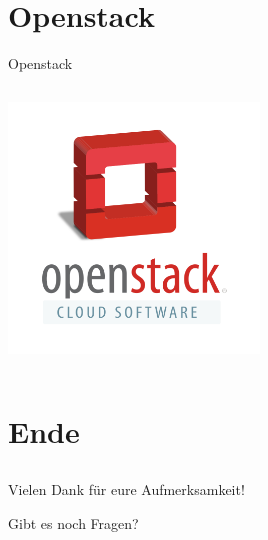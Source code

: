 \documentclass[aspectratio=169]{beamer}
\begin{document}
 
\section{Openstack} 
\begin{frame}{Openstack}
    \begin{columns}
        \begin{column}{1.0\textwidth}
            \centering
            \includegraphics[width=0.5\textwidth]{openstack.png}
        \end{column}
    \end{columns}
\end{frame}



\section{Ende}
 \subsection{}
\begin{frame}{}
    \begin{center}
        {\Huge Vielen Dank für eure Aufmerksamkeit!}
        
        \vspace{0.8cm}
        
        {\huge Gibt es noch Fragen?}
    \end{center}
\end{frame}
\end{document}
